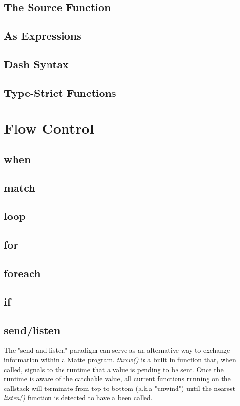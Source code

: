 \documentclass[12pt,letterpaper]{report}
\begin{document}
\section{The Source Function}
\section{As Expressions}
\section{Dash Syntax}
\section{Type-Strict Functions}
\chapter{Flow Control}
\section{when}
\section{match}
\section{loop}
\section{for}
\section{foreach}
\section{if}
\section{send/listen}

The "send and listen" paradigm can serve as an alternative way to exchange information within 
a Matte program. \textit{throw()} is a built in function that, when called, signals to the runtime
that a value is pending to be sent. Once the runtime is aware of the catchable value, all current 
functions running on the callstack will terminate from top to bottom (a.k.a "unwind") until the nearest
\textit{listen()} function is detected to have a been called.
\end{document}

